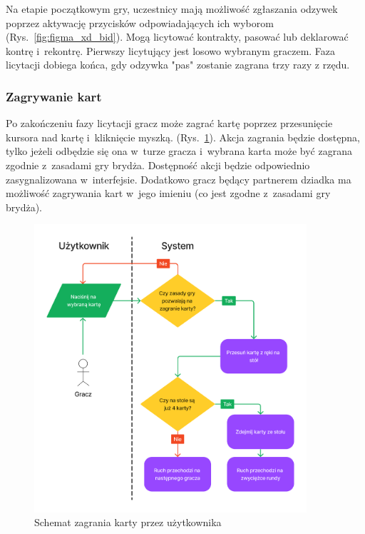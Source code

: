 Na etapie początkowym gry, uczestnicy mają możliwość zgłaszania odzywek poprzez
aktywację przycisków odpowiadających ich wyborom (Rys.~\ref{fig:figma_xd_bid}).
Mogą licytować kontrakty, pasować lub
deklarować kontrę i~rekontrę. Pierwszy licytujący jest losowo
wybranym graczem. Faza licytacji dobiega końca, gdy odzywka "pas"\xspace zostanie zagrana
trzy razy z rzędu.


\FloatBarrier


\subsubsection{Zagrywanie kart}

Po zakończeniu fazy licytacji gracz może zagrać kartę poprzez
przesunięcie kursora nad kartę i~kliknięcie myszką. (Rys.~\ref{fig:figma_xd_play_card}).
Akcja zagrania
będzie dostępna, tylko jeżeli odbędzie się ona w~turze gracza
i~wybrana karta może być zagrana zgodnie z~zasadami gry brydża.
Dostępność akcji będzie odpowiednio zasygnalizowana w~interfejsie.
Dodatkowo gracz będący partnerem dziadka
ma możliwość zagrywania kart w~jego imieniu (co
jest zgodne z~zasadami gry brydża).

\begin{figure}[hbt!]
    \centering
    \includegraphics[width=0.9\textwidth]{img/schematy/play_card.png}
    \caption{Schemat zagrania karty przez użytkownika}
    \label{fig:figma_xd_play_card}
\end{figure}

